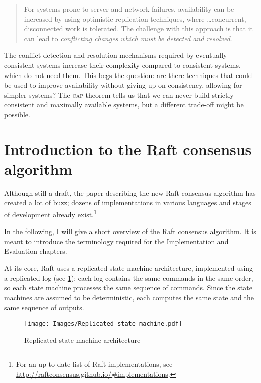 \documentclass[11pt,chapterprefix=true,toc=bibliography,numbers=noendperiod,
               footnotes=multiple,twoside]{scrreprt}
\begin{document}
\begin{quote}
    For systems prone to server and network failures, availability can be increased by using optimistic replication techniques, where \ldots concurrent, disconnected work is tolerated. The challenge with this approach is that it can lead to \emph{conflicting changes which must be detected and resolved}.
\end{quote}

The conflict detection and resolution mechanisms required by eventually consistent systems increase their complexity compared to consistent systems, which do not need them. This begs the question: are there techniques that could be used to improve availability without giving up on consistency, allowing for simpler systems? The \textsc{cap} theorem tells us that we can never build strictly consistent and maximally available systems, but a different trade-off might be possible.

\section{Introduction to the Raft consensus algorithm\label{ssc:raft-consensus-algorithm}}

Although still a draft, the paper describing the new Raft consensus algorithm \autocite{raft} has created a lot of buzz; dozens of implementations in various languages and stages of development already exist.\footnote{For an up-to-date list of Raft implementations, see \url{http://raftconsensus.github.io/\#implementations}.}

In the following, I will give a short overview of the Raft consensus algorithm. It is meant to introduce the terminology required for the Implementation and Evaluation chapters.

At its core, Raft uses a replicated state machine architecture, implemented using a replicated log (see \cref{fig:replicated-state-machine}): each log contains the same commands in the same order, so each state machine processes the same sequence of commands. Since the state machines are assumed to be deterministic, each computes the same state and the same sequence of outputs.

\begin{figure}[h]
    \centering
    \texttt{[image: Images/Replicated\_state\_machine.pdf]}
    \caption{Replicated state machine architecture}
    \label{fig:replicated-state-machine}
\end{figure}
\end{document}
